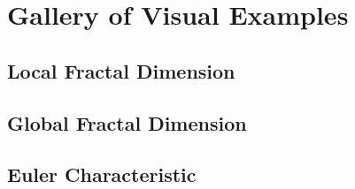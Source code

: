 \chapter{Gallery of Visual Examples}

\section{Local Fractal Dimension}

\section{Global Fractal Dimension}

\section{Euler Characteristic}